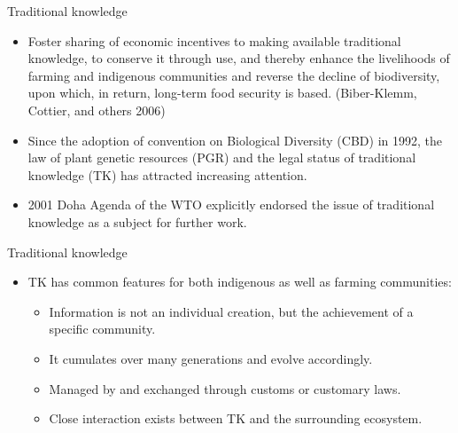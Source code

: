 \documentclass[
  ignorenonframetext,
  aspectratio=169]{beamer}
\providecommand{\tightlist}{%
  \setlength{\itemsep}{0pt}\setlength{\parskip}{0pt}}
\begin{document}
\begin{frame}{Traditional knowledge}
\protect\hypertarget{traditional-knowledge-1}{}
\begin{itemize}
\tightlist
\item
  Foster sharing of economic incentives to making available traditional
  knowledge, to conserve it through use, and thereby enhance the
  livelihoods of farming and indigenous communities and reverse the
  decline of biodiversity, upon which, in return, long-term food
  security is based. (Biber-Klemm, Cottier, and others 2006)
\item
  Since the adoption of convention on Biological Diversity (CBD) in
  1992, the law of plant genetic resources (PGR) and the legal status of
  traditional knowledge (TK) has attracted increasing attention.
\item
  2001 Doha Agenda of the WTO explicitly endorsed the issue of
  traditional knowledge as a subject for further work.
\end{itemize}
\end{frame}

\begin{frame}{Traditional knowledge}
\protect\hypertarget{traditional-knowledge-2}{}
\begin{itemize}
\tightlist
\item
  TK has common features for both indigenous as well as farming
  communities:

  \begin{itemize}
  \tightlist
  \item
    Information is not an individual creation, but the achievement of a
    specific community.
  \item
    It cumulates over many generations and evolve accordingly.
  \item
    Managed by and exchanged through customs or customary laws.
  \item
    Close interaction exists between TK and the surrounding ecosystem.
  \end{itemize}
\end{itemize}
\end{frame}
\end{document}
